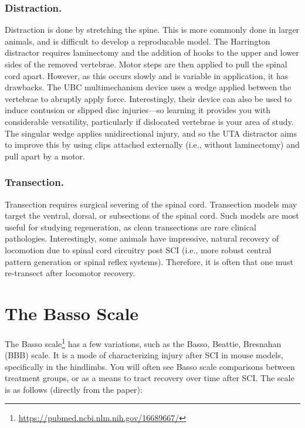 \subsubsection{Distraction.}
Distraction is done by stretching the spine. This is more commonly done in larger animals, and is difficult to develop a reproducable model. The Harrington distractor requires laminectomy and the addition of hooks to the upper and lower sides of the removed vertebrae. Motor steps are then applied to pull the spinal cord apart. However, as this occurs slowly and is variable in application, it has drawbacks. The UBC multimechanism device uses a wedge applied between the vertebrae to abruptly apply force. Interestingly, their device can also be used to induce contusion or slipped disc injuries---so learning it provides you with considerable versatility, particularly if dislocated vertebrae is your area of study. The singular wedge applies unidirectional injury, and so the UTA distractor aims to improve this by using clips attached externally (i.e., without laminectomy) and pull apart by a motor. 

\subsubsection{Transection.}
Transection requires surgical severing of the spinal cord. Transection models may target the ventral, dorsal, or subsections of the spinal cord. Such models are most useful for studying regeneration, as clean transections are rare clinical pathologies. Interestingly, some animals have impressive, natural recovery of locomotion due to spinal cord circuitry post SCI (i.e., more robust central pattern generation or spinal reflex systems). Therefore, it is often that one must re-transect after locomotor recovery. 

\section{The Basso Scale}

The Basso scale\footnote{\url{https://pubmed.ncbi.nlm.nih.gov/16689667/}} has a few variations, such as the Basso, Beattie, Bresnahan (BBB) scale. It is a mode of characterizing injury after SCI in mouse models, specifically in the hindlimbs. You will often see Basso scale comparisons between treatment groups, or as a means to tract recovery over time after SCI. The scale is as follows (directly from the paper): 

